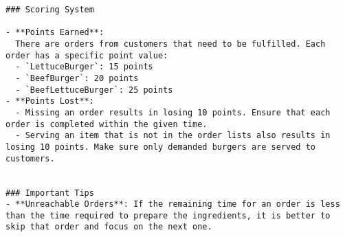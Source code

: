 \begin{lstlisting}
### Scoring System

- **Points Earned**:
  There are orders from customers that need to be fulfilled. Each order has a specific point value:
  - `LettuceBurger`: 15 points
  - `BeefBurger`: 20 points
  - `BeefLettuceBurger`: 25 points
- **Points Lost**:
  - Missing an order results in losing 10 points. Ensure that each order is completed within the given time.
  - Serving an item that is not in the order lists also results in losing 10 points. Make sure only demanded burgers are served to customers.


### Important Tips
- **Unreachable Orders**: If the remaining time for an order is less than the time required to prepare the ingredients, it is better to skip that order and focus on the next one.
\end{lstlisting}